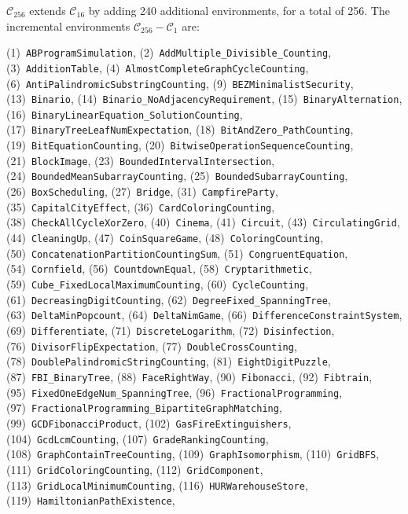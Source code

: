 \documentclass{article}
\theoremstyle{plain}
\theoremstyle{definition}
\theoremstyle{remark}
\begin{document}
$\mathcal{C}_{256}$ extends $\mathcal{C}_{16}$ by adding 240 additional environments, for a total of 256. The incremental environments $\mathcal{C}_{256}-\mathcal{C}_1$ are:
\begin{flushleft}
(1)~\texttt{ABProgramSimulation},
(2)~\texttt{AddMultiple\_Divisible\_Counting},
(3)~\texttt{AdditionTable},
(4)~\texttt{AlmostCompleteGraphCycleCounting},
(6)~\texttt{AntiPalindromicSubstringCounting},
(9)~\texttt{BEZMinimalistSecurity},
(13)~\texttt{Binario},
(14)~\texttt{Binario\_NoAdjacencyRequirement},
(15)~\texttt{BinaryAlternation},
(16)~\texttt{BinaryLinearEquation\_SolutionCounting},
(17)~\texttt{BinaryTreeLeafNumExpectation},
(18)~\texttt{BitAndZero\_PathCounting},
(19)~\texttt{BitEquationCounting},
(20)~\texttt{BitwiseOperationSequenceCounting},
(21)~\texttt{BlockImage},
(23)~\texttt{BoundedIntervalIntersection},
(24)~\texttt{BoundedMeanSubarrayCounting},
(25)~\texttt{BoundedSubarrayCounting},
(26)~\texttt{BoxScheduling},
(27)~\texttt{Bridge},
(31)~\texttt{CampfireParty},
(35)~\texttt{CapitalCityEffect},
(36)~\texttt{CardColoringCounting},
(38)~\texttt{CheckAllCycleXorZero},
(40)~\texttt{Cinema},
(41)~\texttt{Circuit},
(43)~\texttt{CirculatingGrid},
(44)~\texttt{CleaningUp},
(47)~\texttt{CoinSquareGame},
(48)~\texttt{ColoringCounting},
(50)~\texttt{ConcatenationPartitionCountingSum},
(51)~\texttt{CongruentEquation},
(54)~\texttt{Cornfield},
(56)~\texttt{CountdownEqual},
(58)~\texttt{Cryptarithmetic},
(59)~\texttt{Cube\_FixedLocalMaximumCounting},
(60)~\texttt{CycleCounting},
(61)~\texttt{DecreasingDigitCounting},
(62)~\texttt{DegreeFixed\_SpanningTree},
(63)~\texttt{DeltaMinPopcount},
(64)~\texttt{DeltaNimGame},
(66)~\texttt{DifferenceConstraintSystem},
(69)~\texttt{Differentiate},
(71)~\texttt{DiscreteLogarithm},
(72)~\texttt{Disinfection},
(76)~\texttt{DivisorFlipExpectation},
(77)~\texttt{DoubleCrossCounting},
(78)~\texttt{DoublePalindromicStringCounting},
(81)~\texttt{EightDigitPuzzle},
(87)~\texttt{FBI\_BinaryTree},
(88)~\texttt{FaceRightWay},
(90)~\texttt{Fibonacci},
(92)~\texttt{Fibtrain},
(95)~\texttt{FixedOneEdgeNum\_SpanningTree},
(96)~\texttt{FractionalProgramming},
(97)~\texttt{FractionalProgramming\_BipartiteGraphMatching},
(99)~\texttt{GCDFibonacciProduct},
(102)~\texttt{GasFireExtinguishers},
(104)~\texttt{GcdLcmCounting},
(107)~\texttt{GradeRankingCounting},
(108)~\texttt{GraphContainTreeCounting},
(109)~\texttt{GraphIsomorphism},
(110)~\texttt{GridBFS},
(111)~\texttt{GridColoringCounting},
(112)~\texttt{GridComponent},
(113)~\texttt{GridLocalMinimumCounting},
(116)~\texttt{HURWarehouseStore},
(119)~\texttt{HamiltonianPathExistence},

\end{flushleft}
\end{document}
